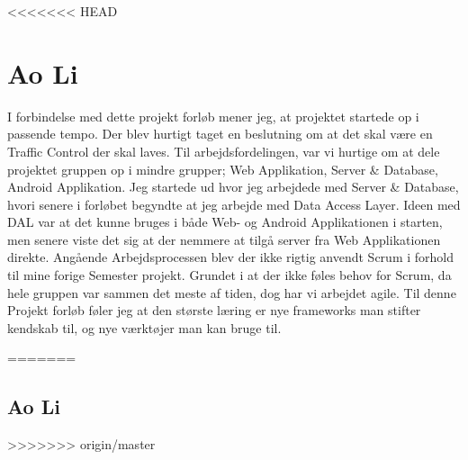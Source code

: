 <<<<<<< HEAD
\section{Ao Li}
I forbindelse med dette projekt forløb mener jeg, at projektet startede op i passende tempo. Der blev hurtigt taget en beslutning om at det skal være en Traffic Control der skal laves. 
Til arbejdsfordelingen, var vi hurtige om at dele projektet gruppen op i mindre grupper; Web Applikation, Server \& Database, Android Applikation. Jeg startede ud hvor jeg arbejdede med  Server \& Database, hvori senere i forløbet begyndte at jeg arbejde med Data Access Layer. Ideen med DAL var at det kunne bruges i både Web- og Android Applikationen i starten, men senere viste det sig at der nemmere at tilgå server fra Web Applikationen direkte. Angående Arbejdsprocessen blev der ikke rigtig anvendt Scrum i forhold til mine forige Semester projekt. Grundet i at der ikke føles behov for Scrum, da hele gruppen var sammen det meste af tiden, dog har vi arbejdet agile. Til denne Projekt forløb føler jeg at den største læring er nye frameworks man stifter kendskab til, og nye værktøjer man kan bruge til.



=======
\subsection{Ao Li}
>>>>>>> origin/master
